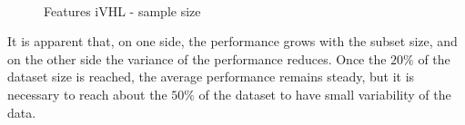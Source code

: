 \begin{figure}[!htb]
  \centering
    \\
    \caption{Features iVHL - sample size}
    \label{ch6:fig12}
\end{figure}

It is apparent that, on one side, the performance grows with the subset size, and on the other side the variance of the performance reduces.
Once the $20\%$ of the dataset size is reached, the average performance remains steady, but it is necessary to reach about the $50\%$ of the dataset to
have small variability of the data.

\vspace{1.0cm}

